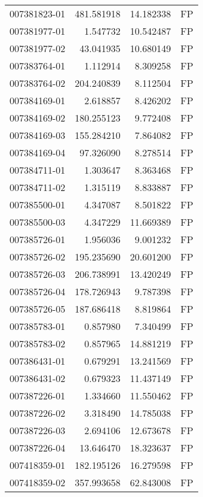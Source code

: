 \begin{tabular}{lrrl}
007381823-01 &  481.581918 &      14.182338 &   FP \\
007381977-01 &    1.547732 &      10.542487 &   FP \\
007381977-02 &   43.041935 &      10.680149 &   FP \\
007383764-01 &    1.112914 &       8.309258 &   FP \\
007383764-02 &  204.240839 &       8.112504 &   FP \\
007384169-01 &    2.618857 &       8.426202 &   FP \\
007384169-02 &  180.255123 &       9.772408 &   FP \\
007384169-03 &  155.284210 &       7.864082 &   FP \\
007384169-04 &   97.326090 &       8.278514 &   FP \\
007384711-01 &    1.303647 &       8.363468 &   FP \\
007384711-02 &    1.315119 &       8.833887 &   FP \\
007385500-01 &    4.347087 &       8.501822 &   FP \\
007385500-03 &    4.347229 &      11.669389 &   FP \\
007385726-01 &    1.956036 &       9.001232 &   FP \\
007385726-02 &  195.235690 &      20.601200 &   FP \\
007385726-03 &  206.738991 &      13.420249 &   FP \\
007385726-04 &  178.726943 &       9.787398 &   FP \\
007385726-05 &  187.686418 &       8.819864 &   FP \\
007385783-01 &    0.857980 &       7.340499 &   FP \\
007385783-02 &    0.857965 &      14.881219 &   FP \\
007386431-01 &    0.679291 &      13.241569 &   FP \\
007386431-02 &    0.679323 &      11.437149 &   FP \\
007387226-01 &    1.334660 &      11.550462 &   FP \\
007387226-02 &    3.318490 &      14.785038 &   FP \\
007387226-03 &    2.694106 &      12.673678 &   FP \\
007387226-04 &   13.646470 &      18.323637 &   FP \\
007418359-01 &  182.195126 &      16.279598 &   FP \\
007418359-02 &  357.993658 &      62.843008 &   FP \\

\end{tabular}
